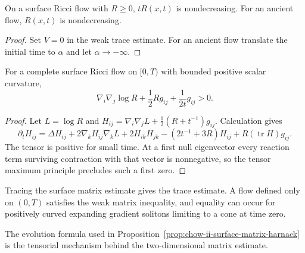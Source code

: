 \begin{corollary}
\label{cor:chow-ii-surface-tr-monotonicity}
On a surface Ricci flow with \(R\ge0\), \(tR(x,t)\) is nondecreasing.  For an
ancient flow, \(R(x,t)\) is nondecreasing.
\end{corollary}
\begin{proof}
Set \(V=0\) in the weak trace estimate.  For an ancient flow translate the
initial time to \(\alpha\) and let \(\alpha\to-\infty\).
\end{proof}

\begin{proposition}
\label{prop:chow-ii-surface-matrix-harnack}
For a complete surface Ricci flow on \([0,T)\) with bounded positive scalar
curvature,
\[
\nabla_i\nabla_j\log R+\frac12Rg_{ij}+\frac1{2t}g_{ij}>0.
\]
\end{proposition}
\begin{proof}
Let \(L=\log R\) and
\(H_{ij}=\nabla_i\nabla_jL+\tfrac12(R+t^{-1})g_{ij}\).  Calculation gives
\[
\partial_tH_{ij}=\Delta H_{ij}+2\nabla_kH_{ij}\nabla_kL
+2H_{ik}H_{jk}-(2t^{-1}+3R)H_{ij}+R(\operatorname{tr}H)g_{ij}.
\]
The tensor is positive for small time.  At a first null eigenvector every
reaction term surviving contraction with that vector is nonnegative, so the
tensor maximum principle precludes such a first zero.
\end{proof}

\begin{remark}
\label{rem:chow-ii-surface-matrix-harnack-consequences}
Tracing the surface matrix estimate gives the trace estimate.  A flow defined
only on \((0,T)\) satisfies the weak matrix inequality, and equality can occur
for positively curved expanding gradient solitons limiting to a cone at time
zero.
\end{remark}

\begin{remark}
\label{rem:chow-ii-surface-matrix-evolution-reference}
The evolution formula used in Proposition~\ref{prop:chow-ii-surface-matrix-harnack}
is the tensorial mechanism behind the two-dimensional matrix estimate.
\end{remark}

